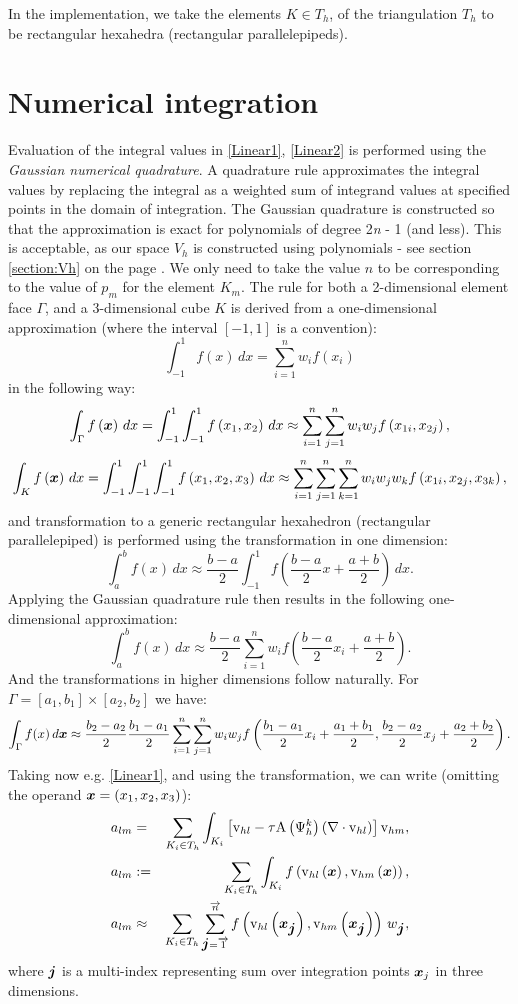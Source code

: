 In the implementation, we take the elements $K \in T_h$, of the triangulation $T_h$ to be rectangular hexahedra (rectangular parallelepipeds).
\section{Numerical integration}
Evaluation of the integral values in \ref{Linear1}, \ref{Linear2} is performed using the \textit{Gaussian numerical quadrature}. A quadrature rule approximates the integral values by replacing the integral as a weighted sum of integrand values at specified points in the domain of integration. The Gaussian quadrature is constructed so that the approximation is exact for polynomials of degree 2\textit{n} - 1 (and less). This is acceptable, as our space $V_h$ is constructed using polynomials - see section \ref{section:Vh} on the page \pageref{section:Vh}. We only need to take the value $n$ to be corresponding to the value of $p_m$ for the element $K_m$. The rule for both a 2-dimensional element face $\Gamma$, and a 3-dimensional cube $K$ is derived from a one-dimensional approximation (where the interval $\left[-1, 1\right]$ is a convention):
$$
\int_{-1}^1 f(x)\,dx = \sum_{i=1}^n w_i f(x_i)
$$
in the following way:
$$
\int_{\Gamma} f\left(\mbox{\boldmath $x$}\right)\,dx = \int_{-1}^{1}\int_{-1}^{1} f\left( x_1, x_2\right)\,dx \approx \sum_{i=1}^n\sum_{j=1}^n w_i w_j f\left( x_{1i}, x_{2j}\right),
$$
$$
\int_{K} f\left(\mbox{\boldmath $x$}\right)\,dx = \int_{-1}^{1}\int_{-1}^{1}\int_{-1}^{1} f\left( x_1, x_2, x_3\right)\,dx \approx \sum_{i=1}^n\sum_{j=1}^n\sum_{k=1}^n w_i w_j w_k f\left( x_{1i}, x_{2j}, x_{3k}\right),
$$
and transformation to a generic rectangular hexahedron (rectangular parallelepiped) is performed using the transformation in one dimension:
$$
\int_a^b f(x)\,dx \approx \frac{b-a}{2} \int_{-1}^1 f\left(\frac{b-a}{2}x + \frac{a+b}{2}\right)\,dx.
$$
Applying the Gaussian quadrature rule then results in the following one-dimensional approximation:
$$
\int_a^b f(x)\,dx \approx \frac{b-a}{2} \sum_{i=1}^n w_i f\left(\frac{b-a}{2}x_i + \frac{a+b}{2}\right).
$$
And the transformations in higher dimensions follow naturally. For $\Gamma = \left[a_1, b_1\right] \times \left[a_2, b_2\right]$ we have:
$$
\int_{\Gamma} f(x)\,d\mbox{\boldmath $x$} \approx \frac{b_2-a_2}{2}\frac{b_1-a_1}{2} \sum_{i=1}^n \sum_{j=1}^n w_i w_j f\left(\frac{b_1-a_1}{2}x_i + \frac{a_1+b_1}{2},\frac{b_2-a_2}{2}x_j + \frac{a_2+b_2}{2}\right).
$$
Taking now e.g. \ref{Linear1}, and using the transformation, we can write (omitting the operand $\mbox{\boldmath $x$} = \left( x_1, x_2, x_3\right)$):
\begin{eqnarray}
a_{lm} & = & \sum_{K_i \in T_h}\int_{K_i} \left[\mathrm{v}_{hl} - \tau\mathrm{A}\left({\mathrm{\Psi}_h^{k}}\right) \left(\nabla \cdot \mathrm{v}_{hl}\right)\right] \mathrm{v}_{hm}, \\
a_{lm} & := & \sum_{K_i \in T_h}\int_{K_i} f\left(\mathrm{v}_{hl}\left(\mbox{\boldmath $x$}\right), \mathrm{v}_{hm}\left(\mbox{\boldmath $x$}\right)\right) , \\
a_{lm} & \approx & \sum_{K_i \in T_h} \sum_{\mbox{\boldmath $j$}=\overrightarrow{1}}^{\overrightarrow{n}} f\left(\mathrm{v}_{hl}\left(\mbox{\boldmath $x$}_{\mbox{\boldmath $j$}}\right), \mathrm{v}_{hm}\left(\mbox{\boldmath $x$}_{\mbox{\boldmath $j$}}\right)\right)\,w_{\mbox{\boldmath $j$}},\label{Final_Integration_Fn}
\end{eqnarray}
where $\mbox{\boldmath $j$}$ is a multi-index representing sum over integration points $\mbox{\boldmath $x$}_j$ in three dimensions.

